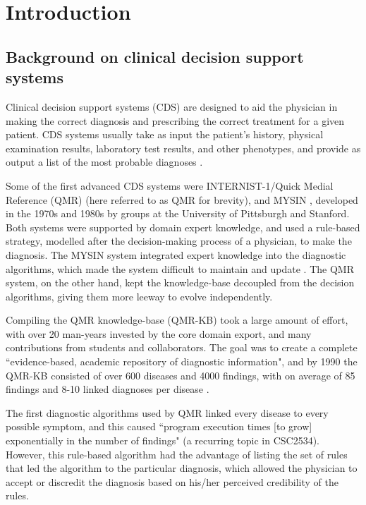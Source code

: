 \documentclass[11pt]{article}
\begin{document}
\section{Introduction} \label{introduction}

\subsection{Background on clinical decision support systems}

Clinical decision support systems (CDS) are designed to aid the physician in making the correct diagnosis and prescribing the correct treatment for a given patient. CDS systems usually take as input the patient's history, physical examination results, laboratory test results, and other phenotypes, and provide as output a list of the most probable diagnoses \cite{Moore2011}. 

Some of the first advanced CDS systems were INTERNIST-1/Quick Medial Reference (QMR) \cite{Myers1987} (here referred to as QMR for brevity), and MYSIN \cite{Buchanan1984}, developed in the 1970s and 1980s by groups at the University of Pittsburgh and Stanford. Both systems were supported by domain expert knowledge, and used a rule-based strategy, modelled after the decision-making process of a physician, to make the diagnosis. The MYSIN system integrated expert knowledge into the diagnostic algorithms, which made the system difficult to maintain and update \cite{Moore2011}. The QMR system, on the other hand, kept the knowledge-base decoupled from the decision algorithms, giving them more leeway to evolve independently.

Compiling the QMR knowledge-base (QMR-KB) took a large amount of effort, with over 20 man-years invested by the core domain export, and many contributions from students and collaborators. The goal was to create a complete ``evidence-based, academic repository of diagnostic information", and by 1990 the QMR-KB consisted of over 600 diseases and 4000 findings, with on average of 85 findings and 8-10 linked diagnoses per disease \cite{Miller2010}. 

The first diagnostic algorithms used by QMR linked every disease to every possible symptom, and this caused ``program execution times [to grow] exponentially in the number of findings" \cite{Miller2010} (a recurring topic in CSC2534). However, this rule-based algorithm had the advantage of listing the set of rules that led the algorithm to the particular diagnosis, which allowed the physician to accept or discredit the diagnosis based on his/her perceived credibility of the rules. 
\end{document}
